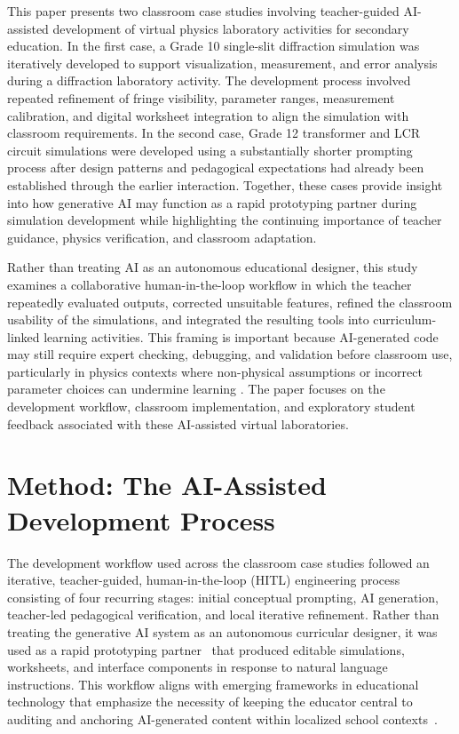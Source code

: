 \documentclass{iopjournal}
\begin{document}
This paper presents two classroom case studies involving teacher-guided AI-assisted development of virtual physics laboratory activities for secondary education. In the first case, a Grade 10 single-slit diffraction simulation was iteratively developed to support visualization, measurement, and error analysis during a diffraction laboratory activity. The development process involved repeated refinement of fringe visibility, parameter ranges, measurement calibration, and digital worksheet integration to align the simulation with classroom requirements. In the second case, Grade 12 transformer and LCR circuit simulations were developed using a substantially shorter prompting process after design patterns and pedagogical expectations had already been established through the earlier interaction. Together, these cases provide insight into how generative AI may function as a rapid prototyping partner during simulation development while highlighting the continuing importance of teacher guidance, physics verification, and classroom adaptation.

Rather than treating AI as an autonomous educational designer, this study examines a collaborative human-in-the-loop workflow in which the teacher repeatedly evaluated outputs, corrected unsuitable features, refined the classroom usability of the simulations, and integrated the resulting tools into curriculum-linked learning activities. This framing is important because AI-generated code may still require expert checking, debugging, and validation before classroom use, particularly in physics contexts where non-physical assumptions or incorrect parameter choices can undermine learning \cite{huang2026,lazaros2026}. The paper focuses on the development workflow, classroom implementation, and exploratory student feedback associated with these AI-assisted virtual laboratories.

\section{Method: The AI-Assisted Development Process}

The development workflow used across the classroom case studies followed an iterative, teacher-guided, human-in-the-loop (HITL) engineering process consisting of four recurring stages: initial conceptual prompting, AI generation, teacher-led pedagogical verification, and local iterative refinement. Rather than treating the generative AI system as an autonomous curricular designer, it was used as a rapid prototyping partner~\cite{li2024,xing2025} that produced editable simulations, worksheets, and interface components in response to natural language instructions. This workflow aligns with emerging frameworks in educational technology that emphasize the necessity of keeping the educator central to auditing and anchoring AI-generated content within localized school contexts~\cite{lazaros2026, techreport2023}.
\end{document}
